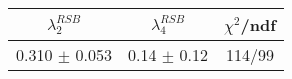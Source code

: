 \begin{tabular}{c|c||c}
$\lambda_{2}^{RSB}$ & $\lambda_4^{RSB}$ & $\chi^{2}$/ndf \\
\hline
0.310 $\pm$ 0.053 & 0.14 $\pm$ 0.12 & 114/99\\
\end{tabular}

